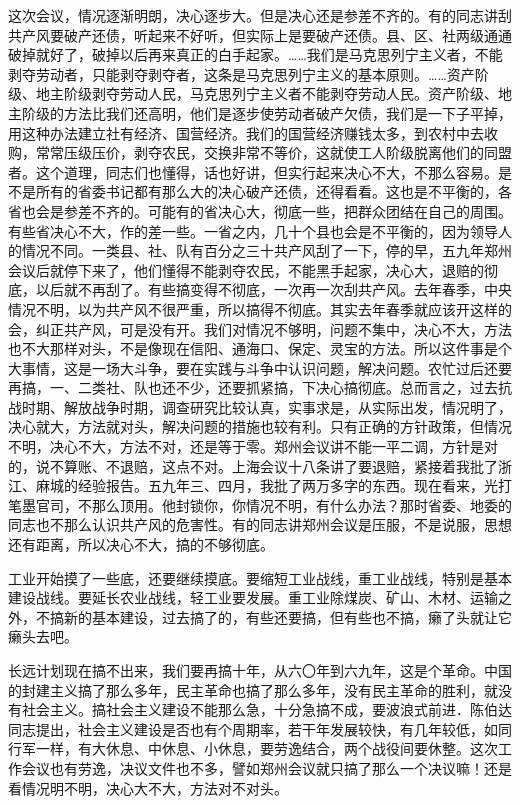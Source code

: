 这次会议，情况逐渐明朗，决心逐步大。但是决心还是参差不齐的。有的同志讲刮共产风要破产还债，听起来不好听，但实际上是要破产还债。县、区、社两级通通破掉就好了，破掉以后再来真正的白手起家。……我们是马克思列宁主义者，不能剥夺劳动者，只能剥夺剥夺者，这条是马克思列宁主义的基本原则。……资产阶级、地主阶级剥夺劳动人民，马克思列宁主义者不能剥夺劳动人民。资产阶级、地主阶级的方法比我们还高明，他们是逐步使劳动者破产欠债，我们是一下子平掉，用这种办法建立社有经济、国营经济。我们的国营经济赚钱太多，到农村中去收购，常常压级压价，剥夺农民，交换非常不等价，这就使工人阶级脱离他们的同盟者。这个道理，同志们也懂得，话也好讲，但实行起来决心不大，不那么容易。是不是所有的省委书记都有那么大的决心破产还债，还得看看。这也是不平衡的，各省也会是参差不齐的。可能有的省决心大，彻底一些，把群众团结在自己的周围。有些省决心不大，作的差一些。一省之内，几十个县也会是不平衡的，因为领导人的情况不同。一类县、社、队有百分之三十共产风刮了一下，停的早，五九年郑州会议后就停下来了，他们懂得不能剥夺农民，不能黑手起家，决心大，退赔的彻底，以后就不再刮了。有些搞变得不彻底，一次再一次刮共产风。去年春季，中央情况不明，以为共产风不很严重，所以搞得不彻底。其实去年春季就应该开这样的会，纠正共产风，可是没有开。我们对情况不够明，问题不集中，决心不大，方法也不大那样对头，不是像现在信阳、通海口、保定、灵宝的方法。所以这件事是个大事情，这是一场大斗争，要在实践与斗争中认识问题，解决问题。农忙过后还要再搞，一、二类社、队也还不少，还要抓紧搞，下决心搞彻底。总而言之，过去抗战时期、解放战争时期，调查研究比较认真，实事求是，从实际出发，情况明了，决心就大，方法就对头，解决问题的措施也较有利。只有正确的方针政策，但情况不明，决心不大，方法不对，还是等于零。郑州会议讲不能一平二调，方针是对的，说不算账、不退赔，这点不对。上海会议十八条讲了要退赔，紧接着我批了浙江、麻城的经验报告。五九年三、四月，我批了两万多字的东西。现在看来，光打笔墨官司，不那么顶用。他封锁你，你情况不明，有什么办法？那时省委、地委的同志也不那么认识共产风的危害性。有的同志讲郑州会议是压服，不是说服，思想还有距离，所以决心不大，搞的不够彻底。

工业开始摸了一些底，还要继续摸底。要缩短工业战线，重工业战线，特别是基本建设战线。要延长农业战线，轻工业要发展。重工业除煤炭、矿山、木材、运输之外，不搞新的基本建设，过去搞了的，有些还要搞，但有些也不搞，癞了头就让它癞头去吧。

长远计划现在搞不出来，我们要再搞十年，从六〇年到六九年，这是个革命。中国的封建主义搞了那么多年，民主革命也搞了那么多年，没有民主革命的胜利，就没有社会主义。搞社会主义建设不能那么急，十分急搞不成，要波浪式前进．陈伯达同志提出，社会主义建设是否也有个周期率，若干年发展较快，有几年较低，如同行军一样，有大休息、中休息、小休息，要劳逸结合，两个战役间要休整。这次工作会议也有劳逸，决议文件也不多，譬如郑州会议就只搞了那么一个决议嘛！还是看情况明不明，决心大不大，方法对不对头。

